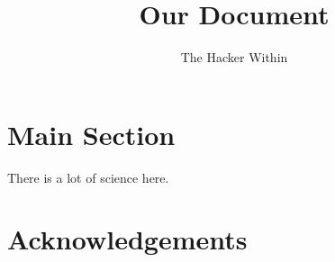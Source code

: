 \documentclass[11pt]{article}
\author{The Hacker Within}
\title{Our Document}
\begin{document}
\maketitle
\section{Main Section}
There is a lot of science here.



\section{Acknowledgements}

\end{document}
